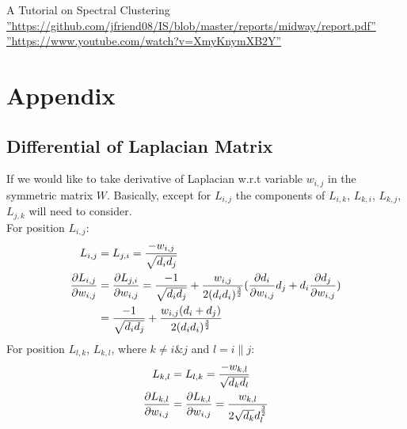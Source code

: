\documentclass[final]{siamltexmm}
\begin{document}
\begin{thebibliography}{10}
 {\sc A Tutorial on Spectral Clustering}
 \hyperref[baseline]{''https://github.com/jfriend08/IS/blob/master/reports/midway/report.pdf''}
 \hyperref[baseline]{''https://www.youtube.com/watch?v=XmyKnymXB2Y''}
\end{thebibliography}

\section{Appendix}
\subsection{Differential of Laplacian Matrix}
If we would like to take derivative of Laplacian w.r.t variable $w_{i,j}$ in the symmetric matrix $W$. Basically, except for $L_{i,j}$ the components of $L_{i,k}$, $L_{k,i}$, $L_{k,j}$, $L_{j,k}$ will need to consider.\\
For position $L_{i,j}$:
\begin{equation}
\begin{aligned}
L_{i,j} &= L_{j,i} =  {-w_{i,j} \over \sqrt{d_id_j}} \\
{\partial L_{i,j} \over \partial w_{i,j}} &= {\partial L_{j,i} \over \partial w_{i,j}} = {-1 \over \sqrt{d_id_j}} + {w_{i,j} \over 2(d_id_i)^{3\over 2}}({\partial d_i \over \partial w_{i,j}}d_j + d_i{\partial d_j \over \partial w_{i,j}}) \\
&= {-1 \over \sqrt{d_id_j}} + {w_{i,j}(d_i+d_j) \over 2(d_id_i)^{3\over 2}}
\end{aligned}
\end{equation}
For position $L_{l,k}$, $L_{k,l}$, where $k \neq i \& j$ and $l = i\|j$:
\begin{equation}
\begin{aligned}
L_{k,l} &= L_{l,k} =  {-w_{k,l} \over \sqrt{d_kd_l}} \\
{\partial L_{k,l} \over \partial w_{i,j}} &= {\partial L_{k,l} \over \partial w_{i,j}} = {w_{k,l} \over 2\sqrt{d_k}d_l^{3\over2}}
\end{aligned}
\end{equation}
\end{document}

